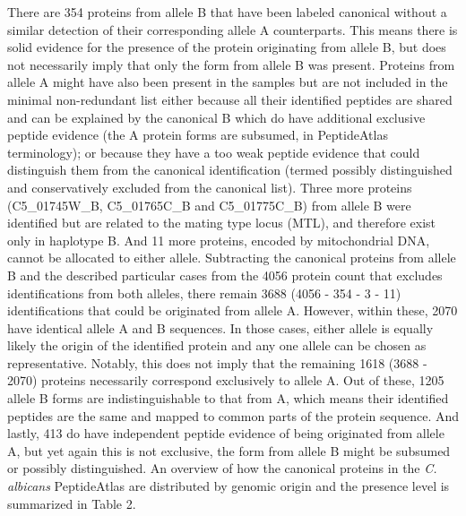 There are 354 proteins from allele B that have been labeled canonical without a similar
detection of their corresponding allele A counterparts. This means there is solid evidence for
the presence of the protein originating from allele B, but does not necessarily imply that only
the form from allele B was present. Proteins from allele A might have also been present in
the samples but are not included in the minimal non-redundant list either because all their
identified peptides are shared and can be explained by the canonical B which do have
additional exclusive peptide evidence (the A protein forms are subsumed, in PeptideAtlas
terminology); or because they have a too weak peptide evidence that could distinguish them
from the canonical identification (termed possibly distinguished and conservatively excluded
from the canonical list).
Three more proteins (C5\_01745W\_B, C5\_01765C\_B and C5\_01775C\_B) from allele B were
identified but are related to the mating type locus (MTL), and therefore exist only in haplotype
B. And 11 more proteins, encoded by mitochondrial DNA, cannot be allocated to either allele.
Subtracting the canonical proteins from allele B and the described particular cases from the
4056 protein count that excludes identifications from both alleles, there remain 3688 (4056 -
354 - 3 - 11) identifications that could be originated from allele A. However, within these,
2070 have identical allele A and B sequences. In those cases, either allele is equally likely
the origin of the identified protein and any one allele can be chosen as representative.
Notably, this does not imply that the remaining 1618 (3688 - 2070) proteins necessarily
correspond exclusively to allele A. Out of these, 1205 allele B forms are indistinguishable to
that from A, which means their identified peptides are the same and mapped to common
parts of the protein sequence. And lastly, 413 do have independent peptide evidence of being
originated from allele A, but yet again this is not exclusive, the form from allele B might be
subsumed or possibly distinguished. An overview of how the canonical proteins in the
\textit{C. albicans} PeptideAtlas are distributed by genomic origin and the presence level is
summarized in Table 2.



